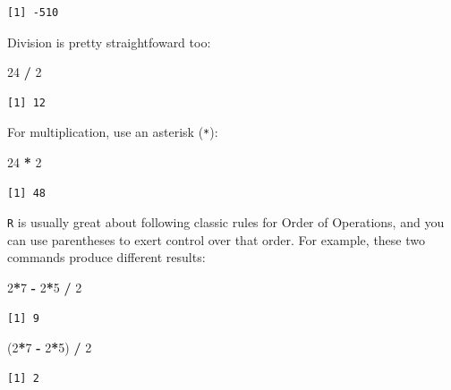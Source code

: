 \documentclass[
]{book}
\newenvironment{Shaded}{\begin{snugshade}}{\end{snugshade}}
\newcommand{\DecValTok}[1]{\textcolor[rgb]{0.00,0.00,0.81}{#1}}
\newcommand{\NormalTok}[1]{#1}
\newcommand{\OperatorTok}[1]{\textcolor[rgb]{0.81,0.36,0.00}{\textbf{#1}}}
\newcommand{\StringTok}[1]{\textcolor[rgb]{0.31,0.60,0.02}{#1}}
\begin{document}
\begin{verbatim}
[1] -510
\end{verbatim}

Division is pretty straightfoward too:

\begin{Shaded}
\begin{Highlighting}[]
\DecValTok{24} \OperatorTok{/}\StringTok{ }\DecValTok{2}
\end{Highlighting}
\end{Shaded}

\begin{verbatim}
[1] 12
\end{verbatim}

For multiplication, use an asterisk (\texttt{*}):

\begin{Shaded}
\begin{Highlighting}[]
\DecValTok{24} \OperatorTok{*}\StringTok{ }\DecValTok{2}
\end{Highlighting}
\end{Shaded}

\begin{verbatim}
[1] 48
\end{verbatim}

\texttt{R} is usually great about following classic rules for Order of Operations, and you can use parentheses to exert control over that order. For example, these two commands produce different results:

\begin{Shaded}
\begin{Highlighting}[]
\DecValTok{2}\OperatorTok{*}\DecValTok{7} \OperatorTok{-}\StringTok{ }\DecValTok{2}\OperatorTok{*}\DecValTok{5} \OperatorTok{/}\StringTok{ }\DecValTok{2}
\end{Highlighting}
\end{Shaded}

\begin{verbatim}
[1] 9
\end{verbatim}

\begin{Shaded}
\begin{Highlighting}[]
\NormalTok{(}\DecValTok{2}\OperatorTok{*}\DecValTok{7} \OperatorTok{-}\StringTok{ }\DecValTok{2}\OperatorTok{*}\DecValTok{5}\NormalTok{) }\OperatorTok{/}\StringTok{ }\DecValTok{2}
\end{Highlighting}
\end{Shaded}

\begin{verbatim}
[1] 2
\end{verbatim}
\end{document}
